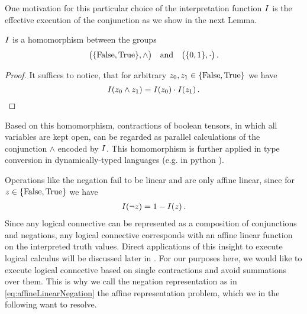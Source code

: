 One motivation for this particular choice of the interpretation function $I$ is the effective execution of the conjunction as we show in the next Lemma.

\begin{lemma}
	$I$ is a homomorphism between the groups	
		\[ \big(\{\mathrm{False},\mathrm{True}\},\land\big) \quad \text{and} \quad \big(\{0,1\},\cdot\big) \, . \]
\end{lemma}
\begin{proof}
	It suffices to notice, that for arbitrary $z_{0},z_{1}\in\{\mathrm{False},\mathrm{True}\}$ we have
		\[ I(z_{0}\land z_{1}) 
		= I(z_{0}) \cdot I(z_{1})  \, . \]
\end{proof}
	
Based on this homomorphism, contractions of boolean tensors, in which all variables are kept open, can be regarded as parallel calculations of the conjunction $\land$ encoded by $I$.
This homomorphism is further applied in type conversion in dynamically-typed languages (e.g. in $\mathrm{python}$ \cite{python_software_foundation_python_2025}).

Operations like the negation fail to be linear and are only affine linear, since for $z\in\{\mathrm{False},\mathrm{True}\}$ we have
\begin{align}\label{eq:affineLinearNegation}
 	I(\lnot z) = 1 - I(z)  \, . 
\end{align}
Since any logical connective can be represented as a composition of conjunctions and negations, any logical connective corresponds with an affine linear function on the interpreted truth values.
Direct applications of this insight to execute logical calculus will be discussed later in .
For our purposes here, we would like to execute logical connective based on single contractions and avoid summations over them.
This is why we call the negation representation as in \eqref{eq:affineLinearNegation} the affine representation problem, which we in the following want to resolve.

